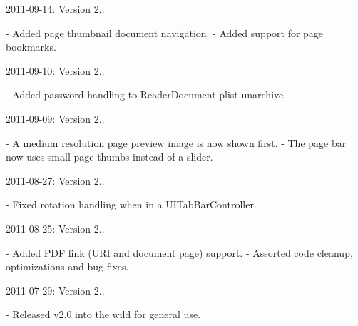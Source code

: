 2011-\/09-\/14\-: Version 2.. \begin{DoxyVerb}- Added page thumbnail document navigation.
- Added support for page bookmarks.
\end{DoxyVerb}


2011-\/09-\/10\-: Version 2.. \begin{DoxyVerb}- Added password handling to ReaderDocument plist unarchive.
\end{DoxyVerb}


2011-\/09-\/09\-: Version 2.. \begin{DoxyVerb}- A medium resolution page preview image is now shown first.
- The page bar now uses small page thumbs instead of a slider.
\end{DoxyVerb}


2011-\/08-\/27\-: Version 2.. \begin{DoxyVerb}- Fixed rotation handling when in a UITabBarController.
\end{DoxyVerb}


2011-\/08-\/25\-: Version 2.. \begin{DoxyVerb}- Added PDF link (URI and document page) support.
- Assorted code cleanup, optimizations and bug fixes.
\end{DoxyVerb}


2011-\/07-\/29\-: Version 2.. \begin{DoxyVerb}- Released v2.0 into the wild for general use.\end{DoxyVerb}
 